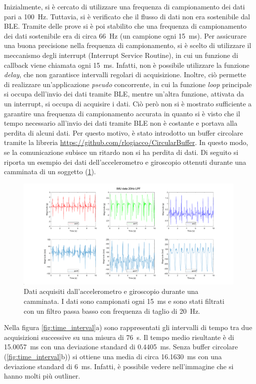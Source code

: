 Inizialmente, si è cercato di utilizzare una frequenza di campionamento dei dati pari a \SI{100}{\hertz}. Tuttavia, si è verificato che il flusso di dati non era sostenibile dal BLE. Tramite delle prove si è poi stabilito che una frequenza di campionamento dei dati sostenibile era di circa \SI{66}{\hertz} (un campione ogni \SI{15}{\milli\second}). Per assicurare una buona precisione nella frequenza di campionamento, si è scelto di utilizzare il meccanismo degli interrupt (Interrupt Service Routine), in cui un funzione di callback viene chiamata ogni \SI{15}{\milli\second}. Infatti, non è possibile utilizzare la funzione \textit{delay}, che non garantisce intervalli regolari di acquisizione. Inoltre, ciò permette di realizzare un'applicazione \textit{pseudo} concorrente, in cui la funzione \textit{loop} principale si occupa dell'invio dei dati tramite BLE, mentre un'altra funzione, attivata da un interrupt, si occupa di acquisire i dati. Ciò però non si è mostrato sufficiente a garantire una frequenza di campionamento accurata in quanto si è visto che il tempo necessario all'invio dei dati tramite BLE non è costante e portava alla perdita di alcuni dati.
Per questo motivo, è stato introdotto un buffer circolare tramite la libreria \url{https://github.com/rlogiacco/CircularBuffer}. In questo modo, se la comunicazione subisce un ritardo non si ha perdita di dati. Di seguito si riporta un esempio dei dati dell'accelerometro e giroscopio ottenuti durante una camminata di un soggetto (\Fig\ref{fig:imu_data}).
\begin{figure}[tbh]
	\centering
	\includegraphics[width=1\linewidth]{./ImageFiles/IMU_data_example.pdf}
	\caption{Dati acquisiti dall'accelerometro e giroscopio durante una camminata. I dati sono campionati ogni \SI{15}{\milli\second} e sono stati filtrati con un filtro passa basso con frequenza di taglio di \SI{20}{\hertz}.}
	\label{fig:imu_data}
\end{figure}
Nella figura \ref{fig:time_interval}a) sono rappresentati gli intervalli di tempo tra due acquisizioni successive su una misura di \SI{76}{\second}. Il tempo medio risultante è di \SI{15.0057}{\milli\second} con una deviazione standard di \SI{0.4405}{\milli\second}. Senza buffer circolare (\Fig\ref{fig:time_interval}b)) si ottiene una media di circa \SI{16.1630}{\milli\second} con una deviazione standard di \SI{6}{\milli\second}. Infatti, è possibile vedere nell'immagine che si hanno molti più outliner.
